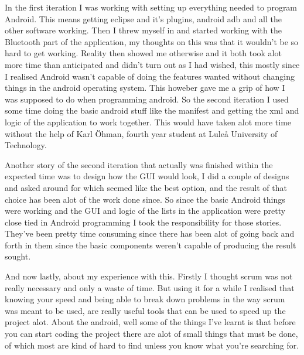 \noindent In the first iteration I was working with setting up everything needed to program Android. This means getting eclipse and it's plugins, android adb and all the other software working. 
Then I threw myself in and started working with the Bluetooth part of the application, my thoughts on this was that it wouldn't be so hard to get working. 
Reality then showed me otherwise and it both took alot more time than anticipated and didn't turn out as I had wished,
this mostly since I realised Android wasn't capable of doing the features wanted without changing things in the android operating system. This howeber gave me a grip of how I was supposed to
do when programming android. So the second iteration I used some time doing the basic android stuff like the manifest and getting the xml and logic of the application to work together. 
This would have taken alot more time without the help of Karl Öhman, fourth year student at Luleå University of Technology.             
\smallskip

\noindent Another story of the second iteration that actually was finished within the expected time was to design how the GUI would look, I did a couple of designs and asked around for which seemed like the best option, and
the result of that choice has been alot of the work done since. So since the basic Android things were working and the GUI and logic of the lists in 
the application were pretty close tied in Android programming I took the responsibility for those stories. They've been pretty time consuming since there has been alot of going back and forth in them since the 
basic components weren't capable of producing the result sought.

And now lastly, about my experience with this. Firstly I thought scrum was not really necessary and only a waste of time. But using it for a while I realised that knowing your speed and being able to break down problems in the way scrum was meant to be used, are really useful tools that can be used to speed up the project alot. About the android, well some of the things I've learnt is that before you can start coding the project there are alot of small things that must be done, of which most are kind of hard to find unless you know what you're searching for.

